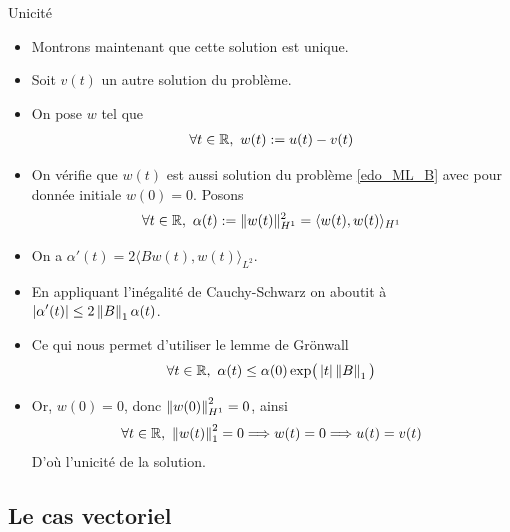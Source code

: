 \begin{frame}{Unicité}
    \begin{itemize}
        \item Montrons maintenant que cette solution est unique. 
        \item Soit $v(t)$ un autre solution du problème. 
        \item On pose $w$ tel que
\begin{eqnarray*}
    \forall t \in \mathbb{R} ,\ w(t) := u(t) - v(t)
\end{eqnarray*} 
\item On vérifie que $w(t)$ est aussi solution du problème \eqref{edo_ML_B} avec pour donnée initiale $w(0)=0$. Posons 
\begin{equation*}
    \forall t \in \mathbb{R}, \ \alpha(t) := \|w(t)\|_{H^1}^2=\langle w(t), w(t) \rangle_{H^1}
\end{equation*}
        \item On a $\alpha'(t) = 2\langle Bw(t),w(t)\rangle_{L^2}$. 
        \item En appliquant l'inégalité de Cauchy-Schwarz on aboutit à $\displaystyle\left\lvert \alpha'(t) \right\rvert \leq 2\left\lVert B \right\rVert_1 \alpha(t)$. 
        \item Ce qui nous permet d'utiliser le lemme de Grönwall
\begin{eqnarray*}
    \forall t \in \mathbb{R}, \ \alpha(t) \leq \alpha(0)\exp\bigr(\displaystyle\left\lvert t \right\rvert\left\lVert B \right\rVert_1\bigl)
\end{eqnarray*} 
\item Or, $w(0) = 0$, donc $\left\lVert w(0) \right\rVert^2_{H^1}=0$, ainsi
\begin{eqnarray*}
    \forall t \in \mathbb{R}, \ \left\lVert w(t) \right\rVert^2_1 = 0 \Longrightarrow w(t) = 0
    \Longrightarrow u(t) = v(t)
\end{eqnarray*}
D'où l'unicité de la solution.
    \end{itemize}
\end{frame}

\subsection{Le cas vectoriel}

